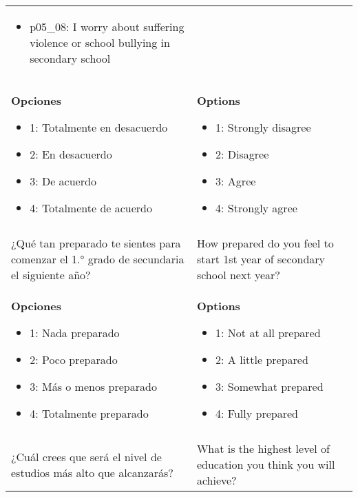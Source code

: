 \documentclass[11pt]{article}
\begin{document}
\begin{longtable}{@{}LL@{}}
\begin{itemize}[leftmargin=*]
\item p05\_08: I worry about suffering violence or school bullying in secondary school\end{itemize} \\
\textbf{Opciones}\par\begin{itemize}[leftmargin=*]\item 1: Totalmente en desacuerdo
\item 2: En desacuerdo
\item 3: De acuerdo
\item 4: Totalmente de acuerdo\end{itemize} & \textbf{Options}\par\begin{itemize}[leftmargin=*]\item 1: Strongly disagree
\item 2: Disagree
\item 3: Agree
\item 4: Strongly agree\end{itemize} \\
\addlinespace[4pt]
 \\ 
¿Qué tan preparado te sientes para comenzar el 1.° grado de secundaria el siguiente año? & How prepared do you feel to start 1st year of secondary school next year? \\
\textbf{Opciones}\par\begin{itemize}[leftmargin=*]\item 1: Nada preparado
\item 2: Poco preparado
\item 3: Más o menos preparado
\item 4: Totalmente preparado\end{itemize} & \textbf{Options}\par\begin{itemize}[leftmargin=*]\item 1: Not at all prepared
\item 2: A little prepared
\item 3: Somewhat prepared
\item 4: Fully prepared\end{itemize} \\
\addlinespace[4pt]
 \\ 
¿Cuál crees que será el nivel de estudios más alto que alcanzarás? & What is the highest level of education you think you will achieve? \\

\end{longtable}
\end{document}
